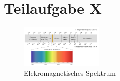 

\section{Teilaufgabe X}

\begin{figure}[h]
    \begin{center}
        \includegraphics[width=4cm]{Emspekt.PNG}
    \end{center}
    \caption{Elekromagnetisches Spektrum}
    \label{fig:meine-grafik}
   \end{figure}
   